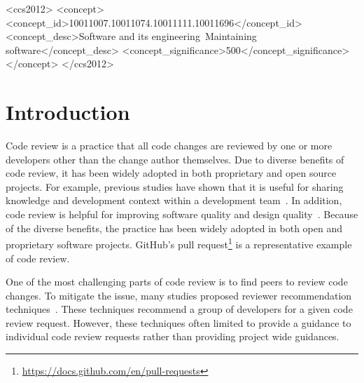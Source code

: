 \documentclass[sigconf]{acmart}
\begin{document}
\begin{CCSXML}
<ccs2012>
   <concept>
       <concept\_id>10011007.10011074.10011111.10011696</concept\_id>
       <concept\_desc>Software and its engineering~Maintaining software</concept\_desc>
       <concept\_significance>500</concept\_significance>
       </concept>
 </ccs2012>
\end{CCSXML}




\maketitle

\section{Introduction}
\label{sec:introduction}


Code review is a practice that all code changes are reviewed by one or more developers other than the change author themselves.
Due to diverse benefits of code review, it has been widely adopted in both proprietary and open source projects.
For example, previous studies have shown that it is useful for sharing knowledge and development context within a development team~\cite{Bacchelli13}.
In addition, code review is helpful for improving software quality and design quality~\cite{McIntosh14, Morales15}.
Because of the diverse benefits, the practice has been widely adopted in both open and proprietary software projects.
GitHub's pull request\footnote{\url{https://docs.github.com/en/pull-requests}} is a representative example of code review.


One of the most challenging parts of code review is to find peers to review code changes.
To mitigate the issue, many studies proposed reviewer recommendation techniques~\cite{Thongtanunam15, Yu16}.
These techniques recommend a group of developers for a given code review request.
However, these techniques often limited to provide a guidance to individual code review requests rather than providing project wide guidances.
\end{document}
